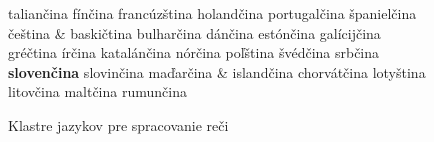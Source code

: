 \begin{multicols}{2}
\begin{figure}[h!]
\begin{tabular}
taliančina \newline  
fínčina \newline 
francúzština \newline 
holandčina \newline 
portugalčina \newline 
španielčina \newline
čeština \newline 
& \vspace*{0.5mm}baskičtina \newline 
bulharčina \newline 
dánčina \newline 
estónčina \newline 
galícijčina \newline 
gréčtina \newline  
írčina \newline  
katalánčina \newline 
nórčina \newline 
poľština \newline 
švédčina \newline
srbčina \newline 
\textbf{slovenčina} \newline 
slovinčina \newline 
maďarčina  \newline
& \vspace*{0.5mm}islandčina \newline  
chorvátčina \newline 
lotyština \newline 
litovčina \newline 
maltčina \newline 
rumunčina\\
\end{tabular}
\label{fig:speech_cluster_sk}
\caption{Klastre jazykov pre spracovanie reči}
\end{figure}


\end{multicols}
